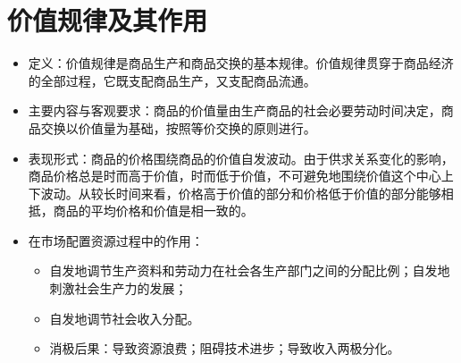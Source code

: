 \documentclass[12pt,openany]{ctexbook}
\begin{document}
\section{价值规律及其作用}
\begin{itemize}
  \item 定义：价值规律是商品生产和商品交换的基本规律。价值规律贯穿于商品经济的全部过程，它既支配商品生产，又支配商品流通。
  \item 主要内容与客观要求：商品的价值量由生产商品的社会必要劳动时间决定，商品交换以价值量为基础，按照等价交换的原则进行。
  \item 表现形式：商品的价格围绕商品的价值自发波动。由于供求关系变化的影响，商品价格总是时而高于价值，时而低于价值，不可避免地围绕价值这个中心上下波动。从较长时间来看，价格高于价值的部分和价格低于价值的部分能够相抵，商品的平均价格和价值是相一致的。
  \item 在市场配置资源过程中的作用：
\begin{itemize}
  \item 自发地调节生产资料和劳动力在社会各生产部门之间的分配比例；自发地刺激社会生产力的发展；
  \item 自发地调节社会收入分配。
  \item 消极后果：导致资源浪费；阻碍技术进步；导致收入两极分化。
\end{itemize}
\end{itemize}
\end{document}
